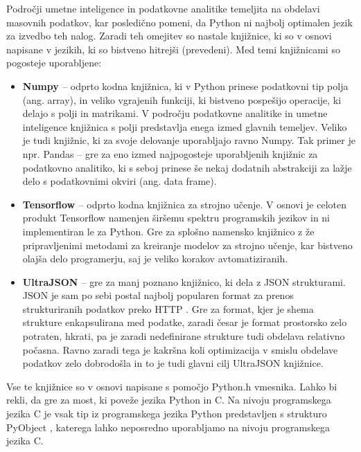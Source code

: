 \documentclass[a4paper,12pt,openright]{book}
\begin{document}
    Področji umetne inteligence in podatkovne analitike temeljita na obdelavi masovnih podatkov, kar posledično pomeni, da Python ni najbolj optimalen jezik za izvedbo teh nalog. Zaradi teh omejitev so nastale knjižnice, ki so v osnovi napisane v jezikih, ki so bistveno hitrejši (prevedeni). Med temi knjižnicami so pogosteje uporabljene:
    \begin{itemize}
        \item \textbf{Numpy \cite{NUMPY_GITHUB}} – odprto kodna knjižnica, ki v Python prinese podatkovni tip polja (ang. array), in veliko vgrajenih funkciji, ki bistveno pospešijo operacije, ki delajo s polji in matrikami. V področju podatkovne analitike in umetne inteligence knjižnica s polji predstavlja enega izmed glavnih temeljev. Veliko je tudi knjižnic, ki za svoje delovanje uporabljajo ravno Numpy. Tak primer je npr. Pandas \cite{PANDAS_GITHUB} – gre za eno izmed najpogosteje uporabljenih knjižnic za podatkovno analitiko, ki s seboj prinese še nekaj dodatnih abstrakciji za lažje delo s podatkovnimi okviri (ang. data frame).
        \item \textbf{Tensorflow \cite{TENSORFLOW_GITHUB}} –  odprto kodna knjižnica za strojno učenje. V osnovi je celoten produkt Tensorflow namenjen širšemu spektru programskih jezikov in ni implementiran le za Python. Gre za splošno namensko knjižnico z že pripravljenimi metodami za kreiranje modelov za strojno učenje, kar bistveno olajša delo programerju, saj je veliko korakov avtomatiziranih.
        \item \textbf{UltraJSON \cite{UJSON_GITHUB}} – gre za manj poznano knjižnico, ki dela z JSON strukturami. JSON je sam po sebi postal najbolj popularen format za prenos strukturiranih podatkov preko HTTP \cite{JSON_ACM}. Gre za format, kjer je shema strukture enkapsulirana med podatke, zaradi česar je format prostorsko zelo potraten, hkrati, pa je zaradi nedefinirane strukture tudi obdelava relativno počasna. Ravno zaradi tega je kakršna koli optimizacija v smislu obdelave podatkov zelo dobrodošla in to je tudi glavni cilj UltraJSON knjižnice.
    \end{itemize}

    \noindent
    Vse te knjižnice so v osnovi napisane s pomočjo Python.h vmesnika. Lahko bi rekli, da gre za most, ki poveže jezika Python in C. Na nivoju programskega jezika C je vsak tip iz programskega jezika Python predstavljen s strukturo PyObject \cite{PY_OBJECT}, katerega lahko neposredno uporabljamo na nivoju programskega jezika C. 
\end{document}

